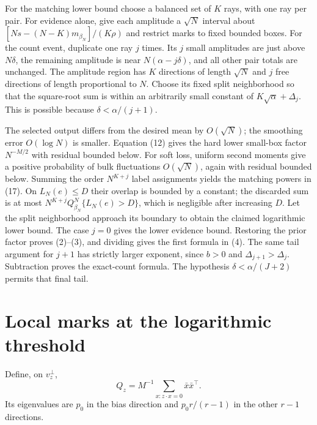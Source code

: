\documentclass[11pt]{article}
\begin{document}
For the matching lower bound choose a balanced set of $K$ rays, with
one ray per pair. For evidence alone, give each amplitude a $\sqrt N$
interval about $[Ns-(N-K)m_{\beta_N}]/(K\rho)$ and restrict marks to
fixed bounded boxes. For the count event, duplicate one ray $j$ times.
Its $j$ small amplitudes are just above $N\delta$, the remaining
amplitude is near $N(\alpha-j\delta)$, and all other pair totals are
unchanged. The amplitude region has $K$ directions of length
$\sqrt N$ and $j$ free directions of length proportional to $N$.
Choose its fixed split neighborhood so that the square-root sum is
within an arbitrarily small constant of $K\sqrt\alpha+\Delta_j$.
This is possible because $\delta<\alpha/(j+1)$.

The selected output differs from the desired mean by $O(\sqrt N)$;
the smoothing error $O(\log N)$ is smaller. Equation (12) gives the
hard lower small-box factor $N^{-M/2}$ with residual bounded below.
For soft loss, uniform second moments give a positive probability
of bulk fluctuations $O(\sqrt N)$, again with residual bounded below.
Summing the order $N^{K+j}$ label assignments yields the matching
powers in (17). On $L_N(e)\le D$ their overlap is bounded by a constant;
the discarded sum is at most $N^{K+j}Q_{\beta_N}^N\{L_N(e)>D\}$,
which is negligible after increasing $D$. Let the split neighborhood
approach its boundary to obtain the claimed logarithmic lower bound.
The case $j=0$ gives the lower evidence bound. Restoring the prior
factor proves (2)--(3), and dividing gives the first formula in (4).
The same tail argument for $j+1$ has strictly larger exponent, since
$b>0$ and $\Delta_{j+1}>\Delta_j$. Subtraction proves the exact-count
formula. The hypothesis $\delta<\alpha/(J+2)$ permits that final tail.

\section{Local marks at the logarithmic threshold}
Define, on $v_z^\perp$,
\[
                 Q_z=M^{-1}\sum_{x:z\cdot x=0}\bar x\bar x^\top.
\]
Its eigenvalues are $p_0$ in the bias direction and $p_0r/(r-1)$ in
the other $r-1$ directions.
\end{document}
